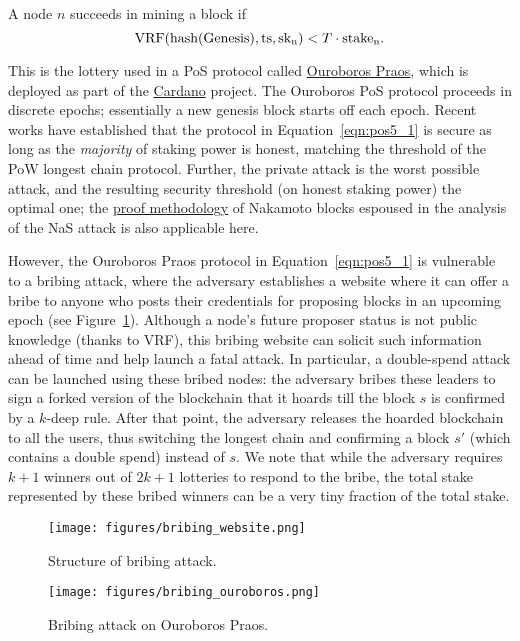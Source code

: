 \documentclass{article}
\begin{document}
 A node $n$ succeeds in mining a block if
\begin{equation}
    \label{eqn:pos5_1}
    {\rm VRF(hash(Genesis),ts,sk_n)} < T\cdot{\rm stake_n}.
\end{equation}

This is the lottery used in a PoS protocol called \href{https://eprint.iacr.org/2017/573.pdf}{Ouroboros Praos}, which is deployed as part of the \href{https://cardano.org/}{Cardano} project. The Ouroboros PoS protocol proceeds in discrete epochs; essentially a new genesis block starts off each epoch. Recent works have established that the protocol in Equation~\ref{eqn:pos5_1} is secure as long as the {\em majority} of staking power is honest, matching the threshold of the PoW longest chain protocol. Further, the private attack is the worst possible attack, and the resulting security threshold (on honest staking power) the optimal one; the \href{https://arxiv.org/abs/2005.10484}{proof methodology} of Nakamoto blocks espoused in the analysis of the NaS attack is also applicable here. 

However, the Ouroboros Praos protocol in Equation~\ref{eqn:pos5_1} is vulnerable to a bribing attack, where the adversary establishes a website where it can offer a bribe to anyone who posts their credentials for proposing blocks in an upcoming epoch (see Figure~\ref{fig:bribing_structure}). Although a node's future proposer status is not public knowledge (thanks to VRF), this bribing website can solicit such information ahead of time and help launch a fatal attack. In particular, a double-spend attack can be launched using these bribed nodes: the adversary bribes these leaders to sign a forked version of the blockchain that it hoards till the block $s$ is confirmed by a $k$-deep rule. After that point, the adversary releases the hoarded blockchain to all the users, thus switching the longest chain and confirming a block $s'$ (which contains a double spend) instead of $s$. We note that while the adversary requires $k+1$ winners out of $2k+1$ lotteries to respond to the bribe, the total stake represented by these bribed winners can be a very tiny fraction of the total stake.

\begin{figure}[ht]
    \centering
\texttt{[image: figures/bribing\_website.png]}
\caption{Structure of bribing attack.} \label{fig:bribing_structure}
\end{figure}

\begin{figure}[ht]
    \centering
\texttt{[image: figures/bribing\_ouroboros.png]}
\caption{Bribing attack on Ouroboros Praos.} \label{fig:ouroboros}
\end{figure}
\end{document}
